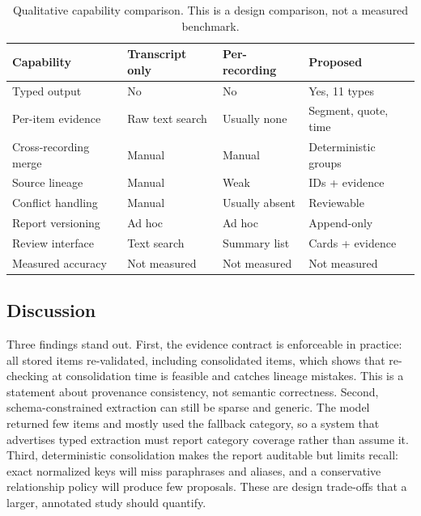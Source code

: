 \documentclass[conference,a4paper]{IEEEtran}
\begin{document}
\begin{table}[!t]
\centering
\caption{Qualitative capability comparison. This is a design comparison, not a measured
benchmark.}
\label{tab:baseline}
\footnotesize
\setlength{\tabcolsep}{3pt}
\renewcommand{\arraystretch}{1.12}
\begin{tabular}{@{}>{\raggedright\arraybackslash}p{2.5cm}>{\raggedright\arraybackslash}p{1.65cm}>{\raggedright\arraybackslash}p{1.65cm}>{\raggedright\arraybackslash}p{2.1cm}@{}}
\toprule
Capability & Transcript only & Per-recording & Proposed \\
\midrule
Typed output & No & No & Yes, 11 types \\
Per-item evidence & Raw text search & Usually none & Segment, quote, time \\
Cross-recording merge & Manual & Manual & Deterministic groups \\
Source lineage & Manual & Weak & IDs + evidence \\
Conflict handling & Manual & Usually absent & Reviewable \\
Report versioning & Ad hoc & Ad hoc & Append-only \\
Review interface & Text search & Summary list & Cards + evidence \\
Measured accuracy & Not measured & Not measured & Not measured \\
\bottomrule
\end{tabular}
\end{table}

\subsection{Discussion}

Three findings stand out. First, the evidence contract is enforceable in practice: all
stored items re-validated, including consolidated items, which shows that re-checking at
consolidation time is feasible and catches lineage mistakes. This is a statement about
provenance consistency, not semantic correctness. Second, schema-constrained
extraction can still be sparse and generic. The model returned few items and mostly used
the fallback category, so a system that advertises typed extraction must report category
coverage rather than assume it. Third, deterministic consolidation makes the report
auditable but limits recall: exact normalized keys will miss paraphrases and aliases, and a
conservative relationship policy will produce few proposals. These are design trade-offs
that a larger, annotated study should quantify.
\end{document}
